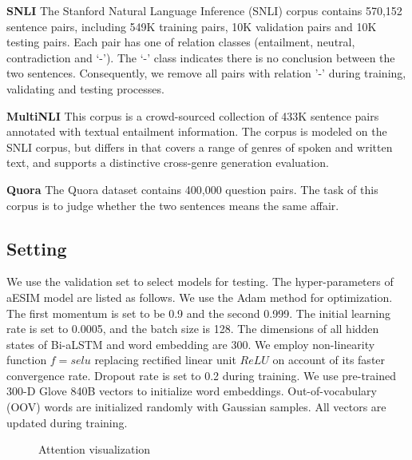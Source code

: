 \documentclass[10pt,sigconf]{acmart}
\begin{document}
\textbf{SNLI} The Stanford Natural Language Inference (SNLI) corpus contains 570,152 sentence pairs, including 549K training pairs, 10K validation pairs and 10K testing pairs. Each pair has one of relation classes (entailment, neutral, contradiction and ‘-’). The ‘-’ class indicates there is no conclusion between the two sentences. Consequently, we remove all pairs with relation '-' during training, validating and testing processes.

\textbf{MultiNLI} This corpus is a crowd-sourced collection of 433K sentence pairs annotated with textual entailment information. The corpus is modeled on the SNLI corpus, but differs in that covers a range of genres of spoken and written text, and supports a distinctive cross-genre generation evaluation.

\textbf{Quora} The Quora dataset contains 400,000 question pairs. The task of this corpus is to judge whether the two sentences means the same affair.

\subsection{Setting}

We use the validation set to select models for testing. The hyper-parameters of aESIM model are listed as follows. We use the Adam method \cite{kingma2014adam} for optimization. The first momentum is set to be 0.9 and the second 0.999. The initial learning rate is set to 0.0005, and the batch size is 128. The dimensions of all hidden states of Bi-aLSTM and word embedding are 300. We employ non-linearity function $f=selu$ \cite{klambauer2017self} replacing rectified linear unit $ReLU$ on account of its faster convergence rate. Dropout rate is set to 0.2 during training. We use pre-trained 300-D Glove 840B vectors \cite{pennington2014glove} to initialize word embeddings. Out-of-vocabulary (OOV) words are initialized randomly with Gaussian samples. All vectors are updated during training.

\begin{figure*}[h]
    \centering
    \caption{Attention visualization}
    \label{fig:attention}
\end{figure*}
\end{document}

